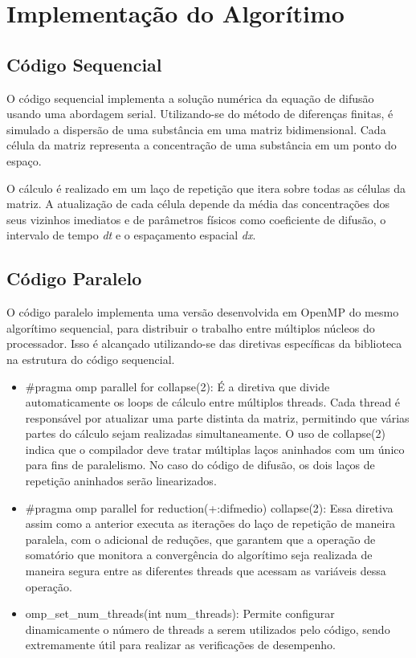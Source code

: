 \documentclass[12pt]{article}
\begin{document}
\section{Implementação do Algorítimo}

\subsection{Código Sequencial}

O código sequencial implementa a solução numérica da equação de difusão usando
uma abordagem serial. Utilizando-se do método de diferenças finitas, é simulado
a dispersão de uma substância em uma matriz bidimensional. Cada célula da
matriz representa a concentração de uma substância em um ponto do espaço.

O cálculo é realizado em um laço de repetição que itera sobre todas as células
da matriz. A atualização de cada célula depende da média das concentrações dos
seus vizinhos imediatos e de parâmetros físicos como coeficiente de difusão, o
intervalo de tempo \textit{dt} e o espaçamento espacial \textit{dx}.

\subsection{Código Paralelo}

O código paralelo implementa uma versão desenvolvida em OpenMP do mesmo
algorítimo sequencial, para distribuir o trabalho entre múltiplos núcleos do
processador. Isso é alcançado utilizando-se das diretivas específicas da
biblioteca na estrutura do código sequencial.

\begin{itemize}
  \item \#pragma omp parallel for collapse(2): É a diretiva que divide
        automaticamente os loops de cálculo entre múltiplos threads. Cada
        thread é
        responsável por atualizar uma parte distinta da matriz, permitindo que
        várias
        partes do cálculo sejam realizadas simultaneamente. O uso de
        collapse(2) indica
        que o compilador deve tratar múltiplas laços aninhados com um único
        para fins
        de paralelismo. No caso do código de difusão, os dois laços de
        repetição
        aninhados serão linearizados.
  \item \#pragma omp parallel for reduction(+:difmedio) collapse(2): Essa
        diretiva assim como a anterior executa as iterações do laço de
        repetição de
        maneira paralela, com o adicional de reduções, que garantem que a
        operação de
        somatório que monitora a convergência do algorítimo seja realizada de
        maneira
        segura entre as diferentes threads que acessam as variáveis dessa
        operação.
  \item omp\_set\_num\_threads(int num\_threads): Permite configurar
        dinamicamente o número de threads a serem utilizados pelo código, sendo
        extremamente útil para realizar as verificações de desempenho.
\end{itemize}
\end{document}
